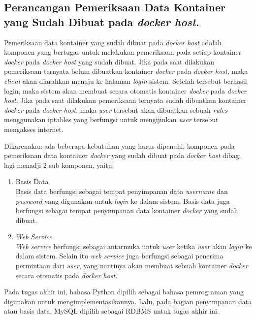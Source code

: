     \subsection{Perancangan Pemeriksaan Data Kontainer yang Sudah Dibuat pada \textit{docker host}.}
    Pemeriksaan data kontainer yang sudah dibuat pada \textit{docker host} adalah komponen yang bertugas untuk melakukan pemeriksaan pada setiap kontainer \textit{docker} pada \textit{docker host} yang sudah dibuat. Jika pada saat dilakukan pemeriksaan ternyata belum dibuatkan kontainer \textit{docker} pada \textit{docker host}, maka \textit{client} akan diarahkan menuju ke halaman \textit{login} sistem. Setelah \textit{} tersebut berhasil login, maka sistem akan membuat secara otomatis kontainer \textit{docker} pada \textit{docker host}. Jika pada saat dilakukan pemeriksaan ternyata sudah dibuatkan kontainer \textit{docker} pada \textit{docker host}, maka \textit{user} tersebut akan dibuatkan sebuah \textit{rules} menggunakan iptables yang berfungsi untuk mengijinkan \textit{user} tersebut mengakses internet.
    
    Dikarenakan ada beberapa kebutuhan yang harus dipenuhi, komponen pada pemeriksaan data kontainer \textit{docker} yang sudah dibuat pada \textit{docker host} dibagi lagi menadji 2 sub komponen, yaitu:
   	\begin{enumerate}
   		\item Basis Data \\
   		Basis data berfungsi sebagai tempat penyimpanan data \textit{username} dan \textit{password} yang digunakan untuk \textit{login} ke dalam sistem. Basis data juga berfungsi sebagai tempat penyimpanan data kontainer \textit{docker} yang sudah dibuat.
   		\item \textit{Web Service} \\
   		\textit{Web service} berfungsi sebagai antarmuka untuk \textit{user} ketika \textit{user} akan \textit{login} ke dalam sistem. Selain itu \textit{web service} juga berfungsi sebagai penerima permintaan dari \textit{user}, yang nantinya akan membuat sebuah kontainer \textit{docker} secara otomatis pada \textit{docker host}.
   	\end{enumerate}
   	
   	Pada tugas akhir ini, bahasa Python dipilih sebagai bahasa pemrograman yang digunakan untuk mengimplementasikannya. Lalu, pada bagian penyimpanan data atau basis data, MySQL dipilih sebagai RDBMS untuk tugas akhir ini.
